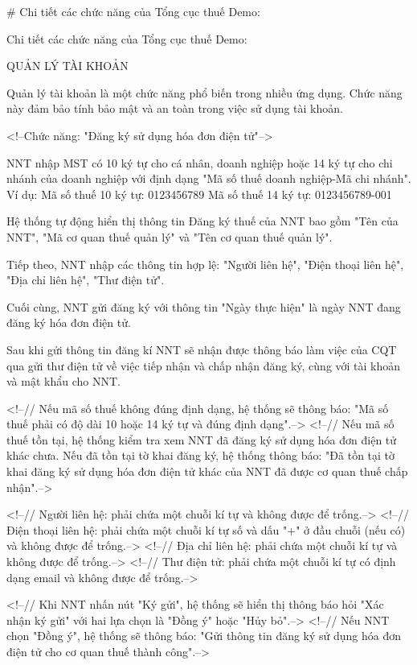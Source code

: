 # Chi tiết các chức năng của Tổng cục thuế Demo:

Chi tiết các chức năng của Tổng cục thuế Demo:

QUẢN LÝ TÀI KHOẢN

Quản lý tài khoản là một chức năng phổ biến trong nhiều ứng dụng. Chức năng này đảm bảo tính bảo mật và an toàn trong việc sử dụng tài khoản.

<!--Chức năng: "Đăng ký sử dụng hóa đơn điện tử"-->

NNT nhập MST có 10 ký tự cho cá nhân, doanh nghiệp hoặc 14 ký tự cho chi nhánh của doanh nghiệp với định dạng "Mã số thuế doanh nghiệp-Mã chi nhánh".
Ví dụ:
Mã số thuế 10 ký tự: 0123456789
Mã số thuế 14 ký tự: 0123456789-001

Hệ thống tự động hiển thị thông tin Đăng ký thuế của NNT bao gồm "Tên của NNT", "Mã cơ quan thuế quản lý" và "Tên cơ quan thuế quản lý".

Tiếp theo, NNT nhập các thông tin hợp lệ: "Người liên hệ", "Điện thoại liên hệ", "Địa chỉ liên hệ", "Thư điện tử".

Cuối cùng, NNT gửi đăng ký với thông tin "Ngày thực hiện" là ngày NNT đang đăng ký hóa đơn điện tử.

Sau khi gửi thông tin đăng kí NNT sẽ nhận được thông báo làm việc của CQT qua gửi thư điện tử về việc tiếp nhận và chấp nhận đăng ký, cùng với tài khoản và mật khẩu cho NNT.

<!--// Nếu mã số thuế không đúng định dạng, hệ thống sẽ thông báo: "Mã số thuế phải có độ dài 10 hoặc 14 ký tự và đúng định dạng".-->
<!--// Nếu mã số thuế tồn tại, hệ thống kiểm tra xem NNT đã đăng ký sử dụng hóa đơn điện tử khác chưa. Nếu đã tồn tại tờ khai đăng ký, hệ thống thông báo: "Đã tồn tại tờ khai đăng ký sử dụng hóa đơn điện tử khác của NNT đã được cơ quan thuế chấp nhận".-->

<!--// Người liên hệ: phải chứa một chuỗi kí tự và không được để trống.-->
<!--// Điện thoại liên hệ: phải chứa một chuỗi kí tự số và dấu "+" ở đầu chuỗi (nếu có) và không được để trống.-->
<!--// Địa chỉ liên hệ: phải chứa một chuỗi kí tự và không được để trống.-->
<!--// Thư điện tử: phải chứa một chuỗi kí tự có định dạng email và không được để trống.-->

<!--// Khi NNT nhấn nút "Ký gửi", hệ thống sẽ hiển thị thông báo hỏi "Xác nhận ký gửi" với hai lựa chọn là "Đồng ý" hoặc "Hủy bỏ".-->
<!--// Nếu NNT chọn "Đồng ý", hệ thống sẽ thông báo: "Gửi thông tin đăng ký sử dụng hóa đơn điện tử cho cơ quan thuế thành công".-->

